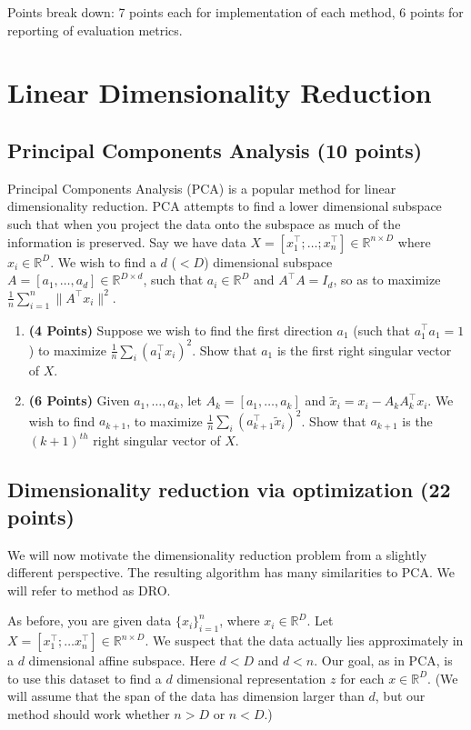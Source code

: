 \documentclass[a4paper]{article}
\newcounter{thm}
\theoremstyle{definition}
\newcommand{\RR}{\mathbb{R}}
\begin{document}
Points break down: 7 points each for implementation of each method, 6 points for reporting of
evaluation metrics.


\section{Linear Dimensionality Reduction}

\subsection{Principal Components Analysis  (10 points)}
\label{sec:pca}

Principal Components Analysis (PCA) is a popular method for linear dimensionality reduction. PCA attempts to find a lower dimensional subspace such that when you project the data onto the subspace as much of the information is preserved. Say we have data $X = [x_1^\top; \dots; x_n^\top] \in \RR^{n\times D}$ where  $x_i \in \RR^D$. We wish to find a $d$ ($ < D$) dimensional subspace $A = [a_1, \dots, a_d] \in \RR^{D\times d}$, such that $ a_i \in \RR^D$ and $A^\top A = I_d$, so as to maximize $\frac{1}{n} \sum_{i=1}^n \|A^\top x_i\|^2$.
\begin{enumerate}

\item  \textbf{(4 Points)}
Suppose we wish to find the first direction $a_1$ (such that $a_1^\top a_1 = 1$) to maximize $\frac{1}{n} \sum_i (a_1^\top x_i)^2$.
Show that $a_1$ is the first right singular vector of $X$.

\item  \textbf{(6 Points)}
Given $a_1, \dots, a_k$, let $A_k = [a_1, \dots, a_k]$ and 
$\tilde{x}_i = x_i - A_kA_k^\top x_i$. We wish to find $a_{k+1}$, to maximize
$\frac{1}{n} \sum_i (a_{k+1}^\top \tilde{x}_i)^2$. Show that $a_{k+1}$ is the
$(k+1)^{th}$ right singular vector of $X$.


\end{enumerate}


\subsection{Dimensionality reduction via optimization (22 points)}

We will now motivate the dimensionality reduction problem from a slightly different
perspective. The resulting algorithm has many similarities to PCA.
We will refer to method as DRO.

As before, you are given data $\{x_i\}_{i=1}^n$, where $x_i \in \RR^D$. Let $X=[x_1^\top; \dots
x_n^\top] \in \RR^{n\times D}$. We suspect that the data
actually lies approximately in  a $d$ dimensional affine subspace.
Here $d<D$ and $d<n$.
Our goal, as in PCA, is to use this dataset to find a $d$ dimensional representation $z$ for each $x\in\RR^D$.
(We will assume that the span of the data has dimension larger than
$d$, but our method should work whether $n>D$ or $n<D$.)
\end{document}
